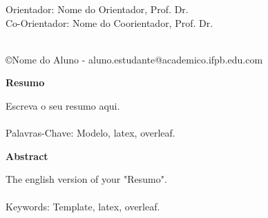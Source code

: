 \documentclass{article}
\begin{document}
\par
\vspace{30pt}
\hspace*{125pt}\parbox{10.0cm}{{\normalsize Orientador: Nome do Orientador, Prof. Dr.}\\
{\normalsize Co-Orientador: Nome do Coorientador, Prof. Dr.}}

\par
\vfill
\begin{center}
{}\\
{{\normalsize \copyright Nome do Aluno -  aluno.estudante@academico.ifpb.edu.com}}
\end{center}




\thispagestyle{empty}
\newpage
\begin{center}
\textbf{\normalsize Resumo}
\end{center}
\vspace{1pt}
   
\noindent Escreva o seu resumo aqui.
\\  \\
Palavras-Chave: Modelo, latex, overleaf.

\thispagestyle{empty}

\newpage
\begin{center}
\textbf{\normalsize Abstract}
\end{center}
\vspace{1pt}

\noindent The english version of your "Resumo".
\\  \\
Keywords: Template, latex, overleaf.

\thispagestyle{empty}
\newpage

\newpage

\newpage

\newpage

 
\end{document}
